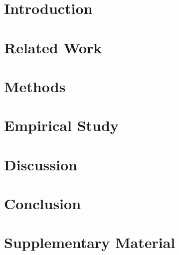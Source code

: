 \documentclass[11pt,a4paper]{article}
\begin{document}
\section{Introduction}
\label{sec:introduction}


\section{Related Work}
\label{sec:related}


\section{Methods}
\label{sec:methods}


\section{Empirical Study}
\label{sec:results}


\section{Discussion}
\label{sec:discussion}


\section{Conclusion}
\label{sec:conclusion}





\appendix
\section{Supplementary Material}
\label{sec:supplemental}

\end{document}
